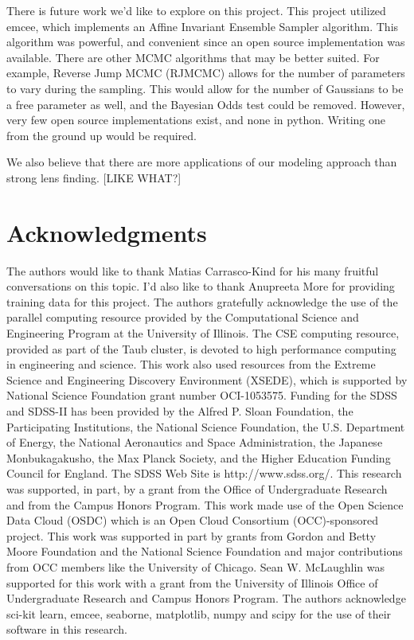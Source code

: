 \documentclass[authoryear, 12pt, 5p, times]{elsarticle}
\begin{document}
There is future work we'd like to explore on this project. This project utilized emcee, which implements an Affine Invariant Ensemble Sampler algorithm. This algorithm was powerful, and convenient since an open source implementation was available. There are other MCMC algorithms that may be better suited. For example, Reverse Jump MCMC (RJMCMC) allows for the number of parameters to vary during the sampling. This would allow for the number of Gaussians to be a free parameter as well, and the Bayesian Odds test could be removed. However, very few open source implementations exist, and none in python. Writing one from the ground up would be required. 

We also believe that there are more applications of our modeling approach than strong lens finding. [LIKE WHAT?]

\section*{Acknowledgments}
The authors would like to thank Matias Carrasco-Kind for his many fruitful conversations on this topic. I’d also like to thank Anupreeta More for providing training data for this project. The authors gratefully acknowledge the use of the parallel computing resource provided by the Computational Science and Engineering Program at the University of Illinois. The CSE computing resource, provided as part of the Taub cluster, is devoted to high performance computing in engineering and science. This work also used resources from the Extreme Science and Engineering Discovery Environment (XSEDE), which is supported by National Science Foundation grant number OCI-1053575. Funding for the SDSS and SDSS-II has been provided by the Alfred P. Sloan Foundation, the Participating Institutions, the National Science Foundation, the U.S. Department of Energy, the National Aeronautics and Space Administration, the Japanese Monbukagakusho, the Max Planck Society, and the Higher Education Funding Council for England. The SDSS Web Site is http://www.sdss.org/. This research was supported, in part, by a grant from the Office of Undergraduate Research and from the Campus Honors Program. This work made use of the Open Science Data Cloud (OSDC) which is an Open Cloud Consortium (OCC)-sponsored project. This work was supported in part by grants from Gordon and Betty Moore Foundation and the National Science Foundation and major contributions from OCC members like the University of Chicago. Sean W. McLaughlin was supported for this work with a grant from the University of Illinois Office of Undergraduate Research and Campus Honors Program. The authors acknowledge sci-kit learn, emcee, seaborne, matplotlib, numpy and scipy for the use of their software in this research.





\label{lastpage}
\end{document}

